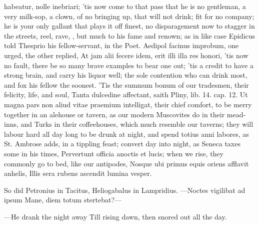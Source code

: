 {habeatur, nolle inebriari; 'tis now come to that pass that he is no
gentleman, a very milk-sop, a clown, of no bringing up, that will not
drink; fit for no company; he is your only gallant that plays it off
finest, no disparagement now to stagger in the streets, reel, rave,
\etc{}, but much to his fame and renown; as in like case Epidicus told
Thesprio his fellow-servant, in the Poet. Aedipol facinus
improbum, one urged, the other replied, At jam alii fecere idem, erit
illi illa res honori, 'tis now no fault, there be so many brave
examples to bear one out; 'tis a credit to have a strong brain, and
carry his liquor well; the sole contention who can drink most, and fox
his fellow the soonest. 'Tis the summum bonum of our tradesmen, their
felicity, life, and soul, Tanta dulcedine affectant, saith Pliny, lib.
14. cap. 12. Ut magna pars non aliud vitae praemium intelligat, their
chief comfort, to be merry together in an alehouse or tavern, as our
modern Muscovites do in their mead-inns, and Turks in their
coffeehouses, which much resemble our taverns; they will labour hard
all day long to be drunk at night, and spend totius anni labores, as
St. Ambrose adds, in a tippling feast; convert day into night, as
Seneca taxes some in his times, Pervertunt officia anoctis et lucis;
when we rise, they commonly go to bed, like our antipodes,
Nosque ubi primus equis oriens afflavit anhelis,
Illis sera rubens ascendit lumina vesper.

So did Petronius in Tacitus, Heliogabalus in Lampridius.
---Noctes vigilibat ad ipsum
Mane, diem totum stertebat?---

---He drank the night away
Till rising dawn, then snored out all the day.

}
